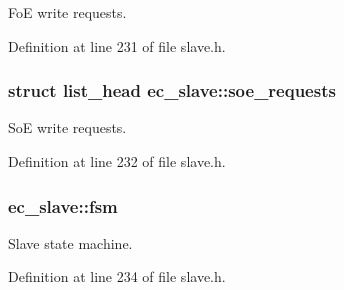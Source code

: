 \-Fo\-E write requests. 



\-Definition at line 231 of file slave.\-h.

\subsubsection[{soe\-\_\-requests}]{\setlength{\rightskip}{0pt plus 5cm}struct list\-\_\-head {\bf ec\-\_\-slave\-::soe\-\_\-requests}}\label{structec__slave_a85daad41c4862aa0de137a3c927abac8}


\-So\-E write requests. 



\-Definition at line 232 of file slave.\-h.

\subsubsection[{fsm}]{ {\bf ec\-\_\-slave\-::fsm}}\label{structec__slave_aecb677b730d579c8eeeaa83a432a74a8}


\-Slave state machine. 



\-Definition at line 234 of file slave.\-h.

